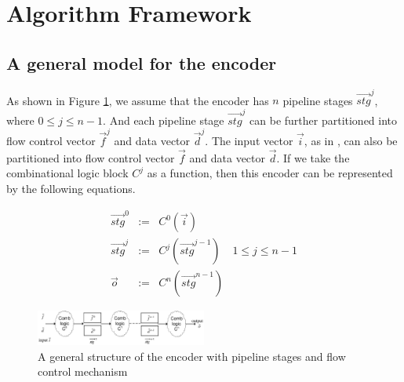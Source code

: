 \documentclass[conference]{IEEEtran}
\begin{document}




\section{Algorithm Framework}\label{sec_framework}


\subsection{A general model for the encoder}
As shown in Figure \ref{fig_pipeenc},
we assume that 
the encoder has $n$ pipeline stages $\vec{stg}^j$,
where $0\le j \le n-1$.
And each pipeline stage $\vec{stg}^j$ can be further partitioned into flow control vector $\vec{f}^j$ and data vector $\vec{d}^j$.
The input vector $\vec{i}$,
as in \cite{QinTODAES15},
can also be partitioned into flow control vector $\vec{f}$ and data vector $\vec{d}$.
If we take the combinational logic block $C^j$ as a function,
then this encoder can be represented by the following equations.

\begin{equation}\label{equ_genpipe}
\begin{array}{cccc}
\vec{stg}^0   & := & C^0(\vec{i})         &\\
\vec{stg}^j   & := & C^j(\vec{stg}^{j-1}) & 1\le j\le n-1\\
\vec{o}       & := & C^n(\vec{stg}^{n-1}) &
\end{array}
\end{equation}


\begin{figure}[b]
\begin{center}
\includegraphics[width=0.5\textwidth]{pipemod1}
\end{center}
\caption{A general structure of the encoder with pipeline stages and flow control mechanism}
  \label{fig_pipeenc}
\end{figure}


\end{document}
